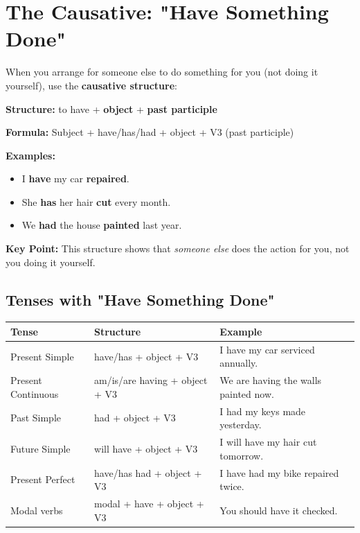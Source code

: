 \section{The Causative: "Have Something Done"}

When you arrange for someone else to do something for you (not doing it yourself), use the \textbf{causative structure}:

\begin{grammarbox}[title=Have Something Done Structure]
\textbf{Structure:} to have + \textbf{object} + \textbf{past participle}

\textbf{Formula:} Subject + have/has/had + object + V3 (past participle)

\textbf{Examples:}
\begin{itemize}
    \item I \textbf{have} my car \textbf{repaired}. 
    \item She \textbf{has} her hair \textbf{cut} every month. 
    \item We \textbf{had} the house \textbf{painted} last year. 
\end{itemize}

\textbf{Key Point:} This structure shows that \textit{someone else} does the action for you, not you doing it yourself.
\end{grammarbox}

\subsection{Tenses with "Have Something Done"}

\begin{table}[h]
\centering
\begin{tabular}{|l|l|l|}
\hline
\textbf{Tense} & \textbf{Structure} & \textbf{Example} \\
\hline
Present Simple & have/has + object + V3 & I have my car serviced annually. \\
\hline
Present Continuous & am/is/are having + object + V3 & We are having the walls painted now. \\
\hline
Past Simple & had + object + V3 & I had my keys made yesterday. \\
\hline
Future Simple & will have + object + V3 & I will have my hair cut tomorrow. \\
\hline
Present Perfect & have/has had + object + V3 & I have had my bike repaired twice. \\
\hline
Modal verbs & modal + have + object + V3 & You should have it checked. \\
\hline
\end{tabular}
\end{table}

